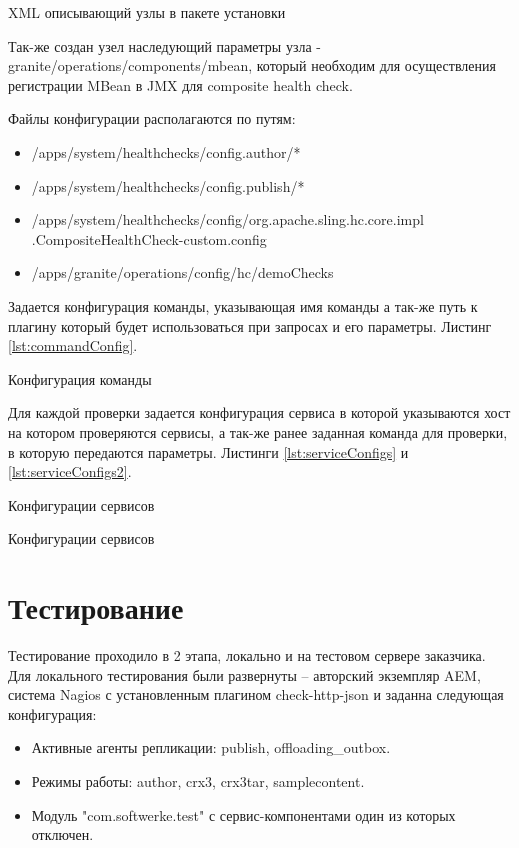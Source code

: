 \begin{listing}[H]
\inputminted[linenos,frame=single]{xml}{inc/src/xmlConfigExample}
\caption{XML описывающий узлы в пакете установки} 
\label{lst:xmlConfigExample}
\end{listing}

Так-же создан узел наследующий параметры узла - granite/operations/components/mbean, который необходим для осуществления регистрации MBean в JMX для composite health check.

Файлы конфигурации располагаются по путям:
\begin{itemize}
\item /apps/system/healthchecks/config.author/*
\item /apps/system/healthchecks/config.publish/*
\item /apps/system/healthchecks/config/org.apache.sling.hc.core.impl .CompositeHealthCheck-custom.config
\item /apps/granite/operations/config/hc/demoChecks
\end{itemize}

Задается конфигурация команды, указывающая  имя команды а так-же путь к плагину который будет использоваться при запросах и его параметры. Листинг \ref{lst:commandConfig}.

\begin{listing}[H]
\caption{Конфигурация команды} 
\label{lst:commandConfig}
\end{listing}

Для каждой проверки задается конфигурация сервиса в которой указываются хост на котором проверяются сервисы, а так-же ранее заданная команда для проверки, в которую передаются параметры. Листинги \ref{lst:serviceConfigs} и \ref{lst:serviceConfigs2}. 

\begin{listing}[H]
\caption{Конфигурации сервисов}
\label{lst:serviceConfigs} 
\end{listing}

\begin{listing}[H]
\caption{Конфигурации сервисов}
\label{lst:serviceConfigs2} 
\end{listing}


\section{Тестирование}

Тестирование проходило в 2 этапа, локально и на тестовом сервере заказчика.
Для локального тестирования были развернуты – авторский экземпляр AEM, система Nagios \cite{web:nagiosInstall} с установленным плагином check-http-json и заданна следующая конфигурация:
\begin{itemize}
\item Активные агенты репликации: publish, offloading\_outbox.
\item Режимы работы: author, crx3, crx3tar, samplecontent.
\item Модуль "com.softwerke.test" с сервис-компонентами один из которых отключен.
\end{itemize}

